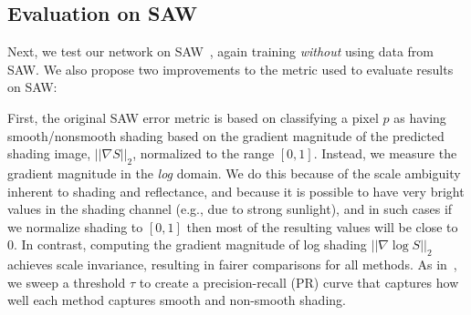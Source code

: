 \documentclass[10pt,twocolumn,letterpaper]{article}
\begin{document}
\subsection{Evaluation on SAW}\begin{table*}[tb]
\end{table*}

Next, we test our network on SAW~\cite{kovacs2017shading}, again training \emph{without} using
data from SAW. We also propose two improvements to the metric used to
evaluate results on SAW:

First, the original SAW error metric
is based on classifying a pixel $p$ as having smooth/nonsmooth shading
based on the gradient magnitude of the predicted shading image, $||
\nabla S ||_2$, normalized to the range $[0,1]$. Instead, we measure
the gradient magnitude in the {\em log} domain. We do this because of
the scale ambiguity inherent to shading and reflectance, and because
it is possible to have very bright values in the shading channel
(e.g., due to strong sunlight), and in such cases if we normalize
shading to $[0,1]$ then most of the resulting values will be close to
0. In contrast, computing the gradient magnitude of log shading $||
\nabla \log S ||_2$ achieves scale invariance, resulting in fairer
comparisons for all methods. As in~\cite{kovacs2017shading}, we sweep a
threshold $\tau$ to create a precision-recall (PR) curve that captures
how well each method captures smooth and non-smooth shading.
\end{document}
